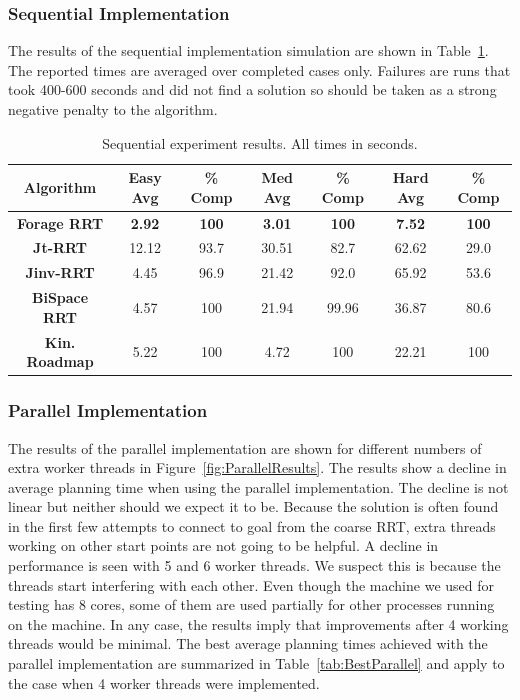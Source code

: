 \documentclass[conference]{IEEEtran}
\begin{document}
\subsubsection{Sequential Implementation}
The results of the sequential implementation simulation are shown in Table~\ref{tab:Results}. The reported times are averaged over completed
cases only. Failures are runs that took 400-600 seconds and did not find a solution so should be taken as a strong negative penalty to the
algorithm.

\begin{table}
        \centering
        \begin{tabular}{| c | c | c | c | c | c | c | }
		\hline
                Algorithm & \textbf{Easy Avg} & \textbf{\% Comp} &\textbf{Med Avg} & \textbf{\% Comp} & \textbf{Hard Avg} & \textbf{\% Comp}\\  \hline
                \textbf{Forage RRT}&\textbf{2.92}&\textbf{100}&\textbf{3.01}&\textbf{100}&\textbf{7.52}&\textbf{100}\\ \hline
                \textbf{Jt-RRT}&12.12&93.7&30.51&82.7&62.62&29.0\\ \hline
                \textbf{Jinv-RRT}&4.45&96.9&21.42&92.0&65.92&53.6\\ \hline
		\textbf{BiSpace RRT}&4.57&100&21.94&99.96&36.87&80.6\\ \hline
   		\textbf{Kin. Roadmap}&5.22&100&4.72&100&22.21&100\\ \hline
        \end{tabular}
        \caption{Sequential experiment results. All times in seconds.}
        \label{tab:Results}
\end{table}

\subsubsection{Parallel Implementation}
The results of the parallel implementation are shown for different numbers of extra worker threads in Figure~\ref{fig:ParallelResults}. The
results show a decline in average planning time when using the parallel implementation. The decline is not linear but neither should we
expect it to be. Because the solution is often found in the first few attempts to connect to goal from the coarse RRT, extra threads working
on other start points are not going to be helpful. A decline in performance is seen with 5 and 6 worker threads. We suspect this is because
the threads start interfering with each other. Even though the machine we used for testing has 8 cores, some of them are used partially for
other processes running on the machine. In any case, the results imply that improvements after 4 working threads would be minimal. The best
average planning times achieved with the parallel implementation are summarized in Table~\ref{tab:BestParallel} and apply to the case when 4
worker threads were implemented.
\end{document}

